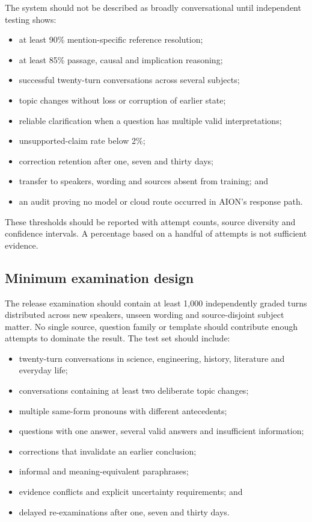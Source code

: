 \documentclass[11pt,a4paper]{article}
\begin{document}
The system should not be described as broadly conversational until independent testing shows:

\begin{itemize}
  \item at least 90\% mention-specific reference resolution;
  \item at least 85\% passage, causal and implication reasoning;
  \item successful twenty-turn conversations across several subjects;
  \item topic changes without loss or corruption of earlier state;
  \item reliable clarification when a question has multiple valid interpretations;
  \item unsupported-claim rate below 2\%;
  \item correction retention after one, seven and thirty days;
  \item transfer to speakers, wording and sources absent from training; and
  \item an audit proving no model or cloud route occurred in AION's response path.
\end{itemize}

These thresholds should be reported with attempt counts, source diversity and confidence
intervals.  A percentage based on a handful of attempts is not sufficient evidence.

\subsection{Minimum examination design}

The release examination should contain at least 1,000 independently graded turns distributed
across new speakers, unseen wording and source-disjoint subject matter.  No single source,
question family or template should contribute enough attempts to dominate the result.  The test
set should include:

\begin{itemize}
  \item twenty-turn conversations in science, engineering, history, literature and everyday life;
  \item conversations containing at least two deliberate topic changes;
  \item multiple same-form pronouns with different antecedents;
  \item questions with one answer, several valid answers and insufficient information;
  \item corrections that invalidate an earlier conclusion;
  \item informal and meaning-equivalent paraphrases;
  \item evidence conflicts and explicit uncertainty requirements; and
  \item delayed re-examinations after one, seven and thirty days.
\end{itemize}
\end{document}
